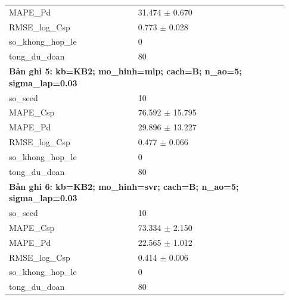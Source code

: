 \begin{longtable}{p{0.43\linewidth}p{0.50\linewidth}}
MAPE\_\allowbreak Pd & 31.474 $\pm$ 0.670 \\
RMSE\_\allowbreak log\_\allowbreak Csp & 0.773 $\pm$ 0.028 \\
so\_\allowbreak khong\_\allowbreak hop\_\allowbreak le & 0 \\
tong\_\allowbreak du\_\allowbreak doan & 80 \\
\midrule
\multicolumn{2}{p{0.95\linewidth}}{\textbf{Bản ghi 5: kb=KB2; mo\_hinh=mlp; cach=B; n\_ao=5; sigma\_lap=0.03}} \\
so\_\allowbreak seed & 10 \\
MAPE\_\allowbreak Csp & 76.592 $\pm$ 15.795 \\
MAPE\_\allowbreak Pd & 29.896 $\pm$ 13.227 \\
RMSE\_\allowbreak log\_\allowbreak Csp & 0.477 $\pm$ 0.066 \\
so\_\allowbreak khong\_\allowbreak hop\_\allowbreak le & 0 \\
tong\_\allowbreak du\_\allowbreak doan & 80 \\
\midrule
\multicolumn{2}{p{0.95\linewidth}}{\textbf{Bản ghi 6: kb=KB2; mo\_hinh=svr; cach=B; n\_ao=5; sigma\_lap=0.03}} \\
so\_\allowbreak seed & 10 \\
MAPE\_\allowbreak Csp & 73.334 $\pm$ 2.150 \\
MAPE\_\allowbreak Pd & 22.565 $\pm$ 1.012 \\
RMSE\_\allowbreak log\_\allowbreak Csp & 0.414 $\pm$ 0.006 \\
so\_\allowbreak khong\_\allowbreak hop\_\allowbreak le & 0 \\
tong\_\allowbreak du\_\allowbreak doan & 80 \\
\midrule
\bottomrule
\end{longtable}

